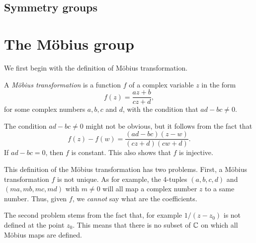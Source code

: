\documentclass[main.tex]{subfiles}
\begin{document}
	\subsection{Symmetry groups}

	
	\section{The M\"obius group}
		We first begin with the definition of M\"obius transformation.
		\begin{definition}
			A \textit{M\"obius transformation} is a function $f$ of a complex variable $z$ in the form
			\begin{equation*}
				f(z) = \frac{az + b}{cz + d},
			\end{equation*}
			for some complex numbers $a, b, c$ and $d$, with the condition that $ad - bc \neq 0$.
		\end{definition}
		The condition $ad - bc \neq 0$ might not be obvious, but it follows from the fact that
		\begin{equation*}
			f(z) - f(w) = \frac{(ad - bc)(z - w)}{(cz+d)(cw + d)}.
		\end{equation*}
		If $ad - bc = 0$, then $f$ is constant. This also shows that $f$ is injective.
		
		This definition of the M\"obius transformation has two problems. First, a M\"obius transformation $f$ is not unique. As for example, the 4-tuples $(a,b,c,d)$ and $(ma, mb, mc, md)$ with $m \neq 0$ will all map a complex number $z$ to a same number. Thus, given $f$, we \textit{cannot} say what are the coefficients.
		
		The second problem stems from the fact that, for example $1/(z - z_0)$ is not defined at the point $z_0$. This means that there is no subset of $\mathbb C$ on which all M\"obius maps are defined.
		
\end{document}
